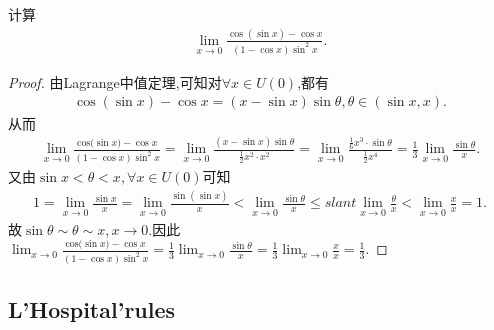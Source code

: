 \documentclass[../../main.tex]{subfiles}
\begin{document}
\begin{example}
计算
\begin{align*}
\lim_{x \to 0} \frac{\cos(\sin x) - \cos x}{(1 - \cos x)\sin^{2}x}.
\end{align*}
\end{example}
\begin{proof}
由Lagrange中值定理,可知对$\forall x\in U\left( 0 \right)$,都有
\begin{align*}
\cos \left( \sin x \right) -\cos x=\left( x-\sin x \right) \sin \theta ,\theta \in \left( \sin x,x \right) .
\end{align*}
从而
\begin{align*}
\lim_{x\rightarrow 0} \frac{\mathrm{cos(}\sin x)-\cos x}{(1-\cos x)\sin ^2x}=\lim_{x\rightarrow 0} \frac{\left( x-\sin x \right) \sin \theta}{\frac{1}{2}x^2\cdot x^2}=\lim_{x\rightarrow 0} \frac{\frac{1}{6}x^3\cdot \sin \theta}{\frac{1}{2}x^4}=\frac{1}{3}\lim_{x\rightarrow 0} \frac{\sin \theta}{x}.
\end{align*}
又由$\sin x<\theta <x,\forall x\in U\left( 0 \right)$可知
\begin{align*}
1=\lim_{x\rightarrow 0} \frac{\sin x}{x}=\lim_{x\rightarrow 0} \frac{\sin \left( \sin x \right)}{x}<\lim_{x\rightarrow 0} \frac{\sin \theta}{x}\leqslant slant \lim_{x\rightarrow 0} \frac{\theta}{x}<\lim_{x\rightarrow 0} \frac{x}{x}=1.
\end{align*}
故$\sin \theta \sim \theta \sim x,x\rightarrow 0$.因此$\lim_{x\rightarrow 0} \frac{\mathrm{cos(}\sin x)-\cos x}{(1-\cos x)\sin ^2x}=\frac{1}{3}\lim_{x\rightarrow 0} \frac{\sin \theta}{x}=\frac{1}{3}\lim_{x\rightarrow 0} \frac{x}{x}=\frac{1}{3}$.
\end{proof}



\subsection{L'Hospital'rules}
\end{document}
